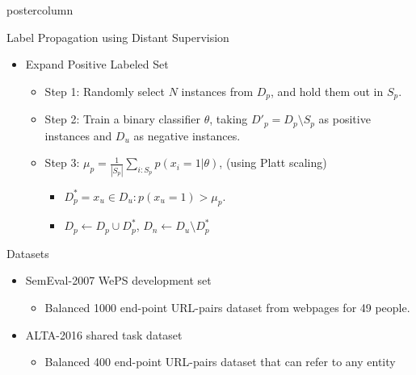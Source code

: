 \documentclass{beamer}
\begin{document}
\begin{frame}
\begin{columns}
\begin{column}{.5\textwidth}
\begin{beamercolorbox}[center]{postercolumn}
\begin{minipage}{.98\textwidth}
{\begin{block}{Label Propagation using Distant Supervision}
\begin{itemize}
\item {Expand Positive Labeled Set}
\begin{itemize}
\item Step 1: Randomly select $N$ instances from $D_{p}$, and hold them out in $S_{p}$.
	\vspace{0.5em}
\item Step 2: Train a binary classifier $\theta$, taking $D'_{p} = D_p \setminus S_p$ as positive instances and $D_{u}$ as negative instances. 
	\vspace{0.5em}
\item Step 3: \mbox{$\mu_{p} = \frac{1}{|S_{p}|}\sum_{i:S_{p}} p(x_{i}=1 | \theta)$,} (using Platt scaling)
	\vspace{0.5em}
\begin{itemize}
\item $D_p^* = {x_u \in D_u: p(x_{u}=1) > \mu_{p}}$.
	\vspace{0.5em}
\item $D_{p} \leftarrow D_{p} \cup D_{p}^*$, $D_{n} \leftarrow D_{u} \setminus D_{p}^*$
\vfill
\end{itemize}
              \end{itemize}
              \end{itemize}
\vspace{0.5em}
            \end{block}
            \vfill
					
	\begin{myblock}{Datasets}
        \begin{itemize}
        \item SemEval-2007 WePS development set 
	\begin{itemize}
		\item Balanced 1000 end-point URL-pairs dataset from webpages for 49 people. 
	\end{itemize}	
	\vspace{0.5em}
	\item ALTA-2016 shared task dataset
	 	\begin{itemize}
		\item Balanced 400 end-point URL-pairs dataset that can refer to any entity 
	      \end{itemize}
          \end{itemize}
        \end{myblock} \vfill

}
\end{minipage}
\end{beamercolorbox}
\end{column}
\end{columns}
\end{frame}
\end{document}
